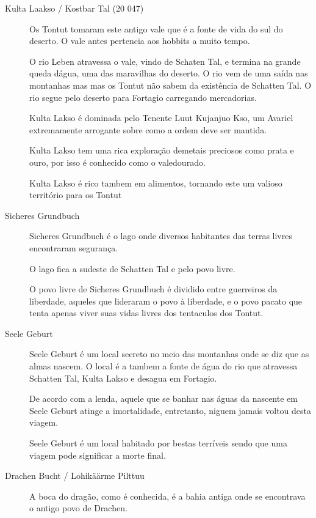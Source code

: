\begin{description}
\item[Kulta Laakso / Kostbar Tal (20 047)]
Os Tontut tomaram este antigo vale que \'e a
fonte de vida do sul do deserto. O vale antes pertencia
aos hobbits a muito tempo.

O rio Leben atravessa o vale, vindo de Schaten Tal, e termina na grande
queda d\'agua, uma das maravilhas do deserto. O rio vem de uma
sa\'ida nas montanhas mas mas os Tontut n\~ao sabem da exist\^encia
de Schatten Tal. O rio segue pelo deserto para Fortagio carregando
mercadorias.

Kulta Lakso \'e dominada pelo Tenente Luut Kujanjuo Kso, um
Avariel extremamente arrogante sobre como a ordem deve ser mantida.

Kulta Lakso tem uma rica explora\c{c}\~ao demetais preciosos como
prata e ouro, por isso \'e conhecido como o valedourado.

Kulta Lakso \'e rico tambem em alimentos, tornando este um valioso
territ\'orio para os Tontut

\item[Sicheres Grundbuch]
Sicheres Grundbuch \'e o lago onde diversos habitantes das terras livres
encontraram seguran\c{c}a.

O lago fica a sudeste de Schatten Tal e pelo povo livre.

O povo livre de Sicheres Grundbuch \'e dividido entre guerreiros
da liberdade, aqueles que lideraram o povo \`a liberdade, e o povo
pacato que tenta apenas viver suas vidas livres dos tentaculos dos
Tontut.

\item[Seele Geburt]
Seele Geburt \'e um local secreto no meio das montanhas onde se diz
que as almas nascem. O local \'e a tambem a fonte de \'agua do rio
que atravessa Schatten Tal, Kulta Lakso e desagua em Fortagio.

De acordo com a lenda, aquele que se banhar nas \'aguas da
nascente em Seele Geburt atinge a imortalidade, entretanto,
niguem jamais voltou desta viagem.

Seele Geburt \'e um local habitado por bestas terr\'iveis
sendo que uma viagem pode significar a morte final.

\item[Drachen Bucht / Lohik\"a\"arme Pilttuu]
A boca do drag\~ao, como \'e conhecida, \'e a bahia antiga
onde se encontrava o antigo povo de Drachen.


\end{description}
